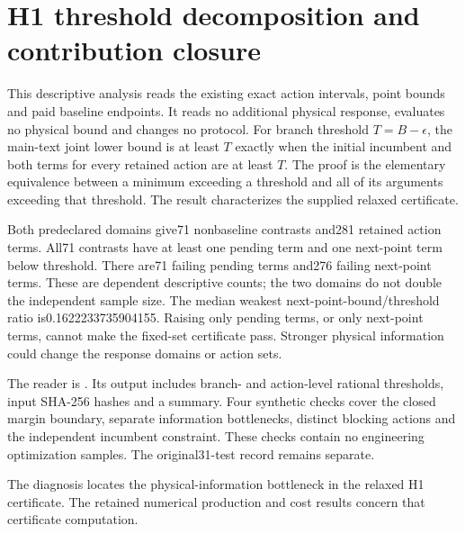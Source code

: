 \section{H1 threshold decomposition and contribution closure}\label{supp:h1_bottleneck}

This descriptive analysis reads the existing exact action intervals, point bounds and paid baseline endpoints. It reads no additional physical response, evaluates no physical bound and changes no protocol. For branch threshold $T=B-\epsilon$, the main-text joint lower bound is at least $T$ exactly when the initial incumbent and both terms for every retained action are at least $T$. The proof is the elementary equivalence between a minimum exceeding a threshold and all of its arguments exceeding that threshold. The result characterizes the supplied relaxed certificate.

Both predeclared domains give71 nonbaseline contrasts and281 retained action terms. All71 contrasts have at least one pending term and one next-point term below threshold. There are71 failing pending terms and276 failing next-point terms. These are dependent descriptive counts; the two domains do not double the independent sample size. The median weakest next-point-bound/threshold ratio is0.1622233735904155. Raising only pending terms, or only next-point terms, cannot make the fixed-set certificate pass. Stronger physical information could change the response domains or action sets.

The reader is . Its output includes branch- and action-level rational thresholds, input SHA-256 hashes and a summary. Four synthetic checks cover the closed margin boundary, separate information bottlenecks, distinct blocking actions and the independent incumbent constraint. These checks contain no engineering optimization samples. The original31-test record remains separate.

The diagnosis locates the physical-information bottleneck in the relaxed H1 certificate. The retained numerical production and cost results concern that certificate computation.
